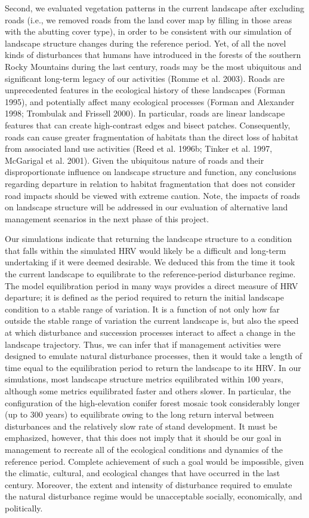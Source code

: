 Second, we evaluated vegetation patterns in the current landscape after excluding roads (i.e., we removed roads from the land cover map by filling in those areas with the abutting cover type), in order to be consistent with our simulation of landscape structure changes during the reference period. Yet, of all the novel kinds of disturbances that humans have introduced in the forests of the southern Rocky Mountains during the last century, roads may be the most ubiquitous and significant long-term legacy of our activities (Romme et al. 2003). Roads are unprecedented features in the ecological history of these landscapes (Forman 1995), and potentially affect many ecological processes (Forman and Alexander 1998; Trombulak and Frissell 2000). In particular, roads are linear landscape features that can create high-contrast edges and bisect patches. Consequently, roads can cause greater fragmentation of habitats than the direct loss of habitat from associated land use activities (Reed et al. 1996b; Tinker et al. 1997, McGarigal et al. 2001). Given the ubiquitous nature of roads and their disproportionate influence on landscape structure and function, any conclusions regarding departure in relation to habitat fragmentation that does not consider road impacts should be viewed with extreme caution. Note, the impacts of roads on landscape structure will be addressed in our evaluation of alternative land management scenarios in the next phase of this project.

Our simulations indicate that returning the landscape structure to a condition that falls within the simulated HRV would likely be a difficult and long-term undertaking if it were deemed desirable. We deduced this from the time it took the current landscape to equilibrate to the reference-period disturbance regime. The model equilibration period in many ways provides a direct measure of HRV departure; it is defined as the period required to return the initial landscape condition to a stable range of variation. It is a function of not only how far outside the stable range of variation the current landscape is, but also the speed at which disturbance and succession processes interact to affect a change in the landscape trajectory. Thus, we can infer that if management activities were designed to emulate natural disturbance processes, then it would take a length of time equal to the equilibration period to return the landscape to its HRV. In our simulations, most landscape structure metrics equilibrated within 100 years, although some metrics equilibrated faster and others slower. In particular, the configuration of the high-elevation conifer forest mosaic took considerably longer (up to 300 years) to equilibrate owing to the long return interval between disturbances and the relatively slow rate of stand development. It must be emphasized, however, that this does not imply that it should be our goal in management to recreate all of the ecological conditions and dynamics of the reference period. Complete achievement of such a goal would be impossible, given the climatic, cultural, and ecological changes that have occurred in the last century. Moreover, the extent and intensity of disturbance required to emulate the natural disturbance regime would be unacceptable socially, economically, and politically.